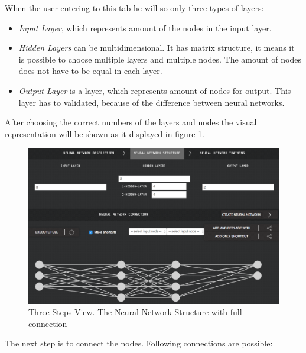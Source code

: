 When the user entering to this tab he will so only three types of layers: 
\begin{itemize}
\item \emph{Input Layer}, which represents amount of the nodes in the input layer.
\item \emph{Hidden Layers} can be multidimensional. It has matrix structure, it means it is possible to choose multiple layers and multiple nodes. The amount of nodes does not have to be equal in each layer.
\item \emph{Output Layer} is a layer, which represents amount of nodes for output. This layer has to validated, because of the difference between neural networks. 
\end{itemize}

After choosing the correct numbers of the layers and nodes the visual representation will be shown as it displayed in figure \ref{fig:nn_structure_3_steps}.


\begin{figure}[htbp]
\begin{center}
  \includegraphics[width=\linewidth]{components/5/img/nn_structure_3_steps.png}
  \caption{Three Steps View. The Neural Network Structure with full connection}
  \label{fig:nn_structure_3_steps}
\end{center}
\end{figure}

The next step is to connect the nodes. Following connections are possible:

